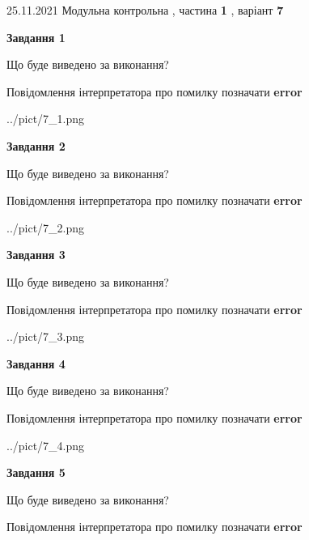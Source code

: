 \documentclass[10pt, ukrainian]{article}
\begin{document}
{25.11.2021 Модульна контрольна , частина \textbf { 1 }, варіант  \No \textbf { 7 }\par}
{
\begin {large}

{\begin {center}\textbf{Завдання 1}\end {center}}\par
Що буде виведено за виконання? \par
Повідомлення інтерпретатора про помилку позначати \textbf{error}

\begin{center}
	{../pict/7_1.png}
\end{center}
\newpage

{\begin {center}\textbf{Завдання 2}\end {center}}\par
Що буде виведено за виконання? \par
Повідомлення інтерпретатора про помилку позначати \textbf{error}

\begin{center}
	{../pict/7_2.png}
\end{center}
\newpage

{\begin {center}\textbf{Завдання 3}\end {center}}\par
Що буде виведено за виконання? \par
Повідомлення інтерпретатора про помилку позначати \textbf{error}

\begin{center}
	{../pict/7_3.png}
\end{center}
\newpage

{\begin {center}\textbf{Завдання 4}\end {center}}\par
Що буде виведено за виконання? \par
Повідомлення інтерпретатора про помилку позначати \textbf{error}

\begin{center}
	{../pict/7_4.png}
\end{center}
\newpage

{\begin {center}\textbf{Завдання 5}\end {center}}\par
Що буде виведено за виконання? \par
Повідомлення інтерпретатора про помилку позначати \textbf{error}


\end{large}}
\end{document}
